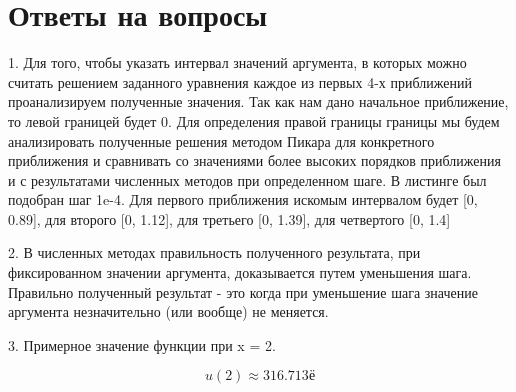 \chapter{Ответы на вопросы}


1. Для того, чтобы указать интервал значений аргумента, 
в которых можно считать решением заданного
уравнения каждое из первых 4-х приближений проанализируем
полученные значения.
Так как нам дано начальное приближение, то левой границей будет 0.
Для определения правой границы границы мы будем анализировать полученные
решения методом Пикара для конкретного приближения и сравнивать со значениями 
более высоких порядков приближения и с результатами численных методов при 
определенном шаге. В листинге был подобран шаг 1e-4.
Для первого приближения искомым интервалом будет [0, 0.89], 
для второго [0, 1.12], для третьего  [0, 1.39], для четвертого [0, 1.4]


2. В численных методах правильность полученного результата, при 
фиксированном значении аргумента, доказывается путем уменьшения шага.
Правильно полученный результат - это когда при уменьшение 
шага значение аргумента незначительно (или вообще) не меняется.

3. Примерное значение функции при x = 2.


\begin{equation}
	u(2) \approx 316.713
	\label{eq:ref4}ё
\end{equation}
